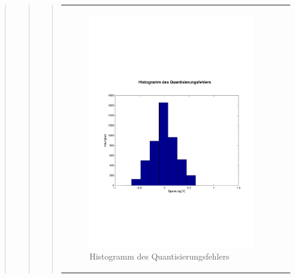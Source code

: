 \begin{quote}
\begin{quote}
\begin{quote}
\begin{center}
\begin{tabular}{ll}
                    \begin{minipage}{0.6\textwidth}
                        \begin{figure}[H]
                            \includegraphics[scale=0.4, trim = 0cm 7cm 0cm
                            7.5cm, clip]
                            {./Bilder/sin8_Histogramm}
                              \caption{Histogramm des Quantisierungsfehlers}
                        \end{figure}
                    \end{minipage}
                
                \end{tabular}
            \end{center}
            \vspace{1em}
            
    

\end{quote}
\end{quote}
\end{quote}
